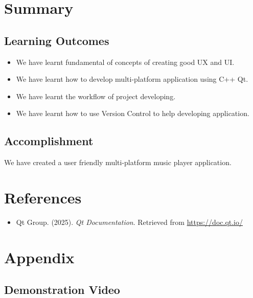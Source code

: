 \documentclass[12pt]{report} %
\begin{document}
\chapter{Summary}
\section{Learning Outcomes}
\begin{itemize}
    \item We have learnt fundamental of concepts of creating good UX and UI.
    \item We have learnt how to develop multi-platform application using C++ Qt.
    \item We have learnt the workflow of project developing.
    \item We have learnt how to use Version Control to help developing application.
\end{itemize}

\section{Accomplishment}
\hspace{1cm}We have created a user friendly multi-platform music player application.

\newpage

\chapter{References}
\begin{itemize}
    \item Qt Group. (2025). \textit{Qt Documentation}. Retrieved from \url{https://doc.qt.io/}
\end{itemize}

\newpage

\chapter{Appendix}

\section{Demonstration Video}
\end{document}
